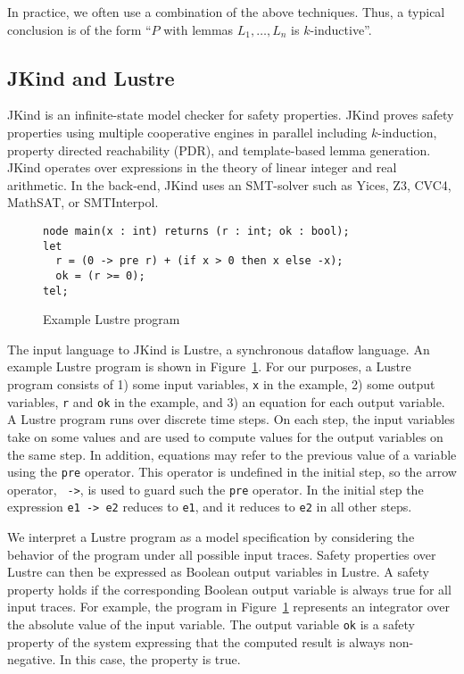 In practice, we often use a combination of the above techniques. Thus,
a typical conclusion is of the form ``$P$ with lemmas $L_1, \ldots, L_n$
is $k$-inductive''.

\subsection{JKind and Lustre}
\label{subsec:jkind}

JKind is an infinite-state model checker for safety properties. JKind
proves safety properties using multiple cooperative engines in
parallel including $k$-induction, property directed reachability
(PDR), and template-based lemma generation. JKind operates over
expressions in the theory of linear integer and real arithmetic. In
the back-end, JKind uses an SMT-solver such as Yices, Z3, CVC4,
MathSAT, or SMTInterpol.

\begin{figure}[t]
\begin{verbatim}
node main(x : int) returns (r : int; ok : bool);
let
  r = (0 -> pre r) + (if x > 0 then x else -x);
  ok = (r >= 0);
tel;
\end{verbatim}
  \caption{Example Lustre program}
  \label{fig:lustre-ex}
\end{figure}

The input language to JKind is Lustre, a synchronous dataflow language.
An example Lustre program is shown in Figure~\ref{fig:lustre-ex}. For
our purposes, a Lustre program consists of 1) some input variables,
{\tt x} in the example, 2) some output variables, {\tt r} and {\tt ok}
in the example, and 3) an equation for each output variable. A Lustre
program runs over discrete time steps. On each step, the input
variables take on some values and are used to compute values for the
output variables on the same step. In addition, equations may refer to
the previous value of a variable using the {\tt pre} operator. This
operator is undefined in the initial step, so the arrow operator, {\tt
  ->}, is used to guard such the {\tt pre} operator. In the initial
step the expression {\tt e1 -> e2} reduces to {\tt e1}, and it
reduces to {\tt e2} in all other steps.

We interpret a Lustre program as a model specification by considering
the behavior of the program under all possible input traces. Safety
properties over Lustre can then be expressed as Boolean output
variables in Lustre. A safety property holds if the corresponding
Boolean output variable is always true for all input traces. For
example, the program in Figure~\ref{fig:lustre-ex} represents an
integrator over the absolute value of the input variable. The output
variable {\tt ok} is a safety property of the system expressing that
the computed result is always non-negative. In this case, the property
is true.

